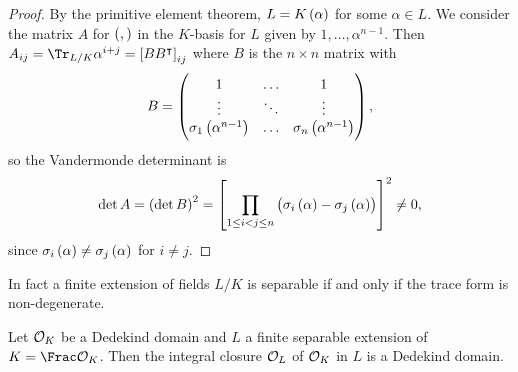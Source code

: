 \begin{proof}
By the primitive element theorem, $ L = K\br{\alpha} $ for some $ \alpha \in L $. We consider the matrix $ A $ for $ \br{,} $ in the $ K $-basis for $ L $ given by $ 1, \dots, \alpha^{n - 1} $. Then $ A_{ij} = \Tr_{L / K} \alpha^{i + j} = \sbr{BB^\intercal}_{ij} $ where $ B $ is the $ n \times n $ matrix with
$$ B = \threebythree{1}{\dots}{1}{\vdots}{\ddots}{\vdots}{\sigma_1\br{\alpha^{n - 1}}}{\dots}{\sigma_n\br{\alpha^{n - 1}}}, $$
so the Vandermonde determinant is
$$ \det A = \br{\det B}^2 = \sbr{\prod_{1 \le i < j \le n} \br{\sigma_i\br{\alpha} - \sigma_j\br{\alpha}}}^2 \ne 0, $$
since $ \sigma_i\br{\alpha} \ne \sigma_j\br{\alpha} $ for $ i \ne j $.
\end{proof}

\begin{remark*}
In fact a finite extension of fields $ L / K $ is separable if and only if the trace form is non-degenerate.
\end{remark*}

\begin{theorem}
\label{thm:11.5}
Let $ \mathcal{O}_K $ be a Dedekind domain and $ L $ a finite separable extension of $ K = \Frac \OOO_K $. Then the integral closure $ \mathcal{O}_L $ of $ \mathcal{O}_K $ in $ L $ is a Dedekind domain.
\end{theorem}

